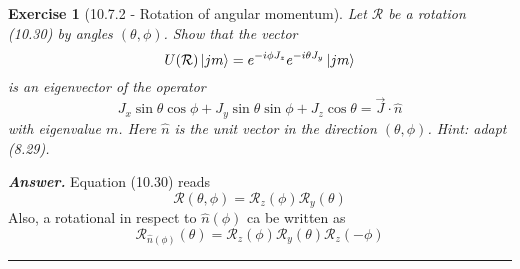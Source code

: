 \documentclass[12pt]{article}
\def\be{\begin{equation}}
\def\ee{\end{equation}}
\newtheorem{exercise}{Exercise}
\newenvironment{answer}{\noindent\textbf{\textit{Answer.}} \normalfont }{\par\noindent\rule{\textwidth}{0.4pt}}
\begin{document}
	
	\begin{exercise}[10.7.2 - Rotation of angular momentum]
		Let $\mathcal{R}$ be a rotation (10.30) by angles $(\theta, \phi)$. Show that the vector
		\be
			U(\mathcal{R})\ket{jm} = e^{-i\phi J_z}e^{-i\theta J_y}\ket{jm}
		\ee
		is an eigenvector of the operator
		\be
			J_x \sin\theta \cos\phi + J_y \sin\theta\sin\phi + J_z \cos\theta = \vec{J}\cdot\hat{n}
		\ee
		with eigenvalue $m$. Here $\hat{n}$ is the unit vector in the direction $(\theta, \phi)$. Hint: adapt (8.29).		
	\end{exercise}
	\begin{answer}
		Equation (10.30) reads
		\be
			\mathcal{R}(\theta, \phi) = \mathcal{R}_z(\phi)\mathcal{R}_y(\theta)
		\ee
		Also, a rotational in respect to $\hat{n}(\phi)$ ca be written as
		\be
			\mathcal{R}_{\hat{n}(\phi)}(\theta) = \mathcal{R}_z(\phi)\mathcal{R}_y(\theta)\mathcal{R}_z(-\phi)
		\ee
		
	\end{answer}
	
	
\end{document}
